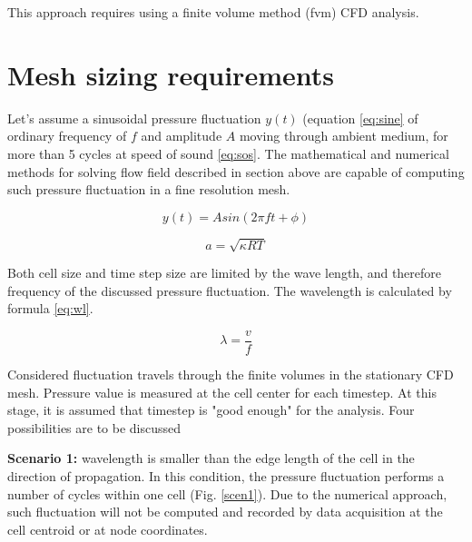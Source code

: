 This approach requires using a finite volume method (fvm) CFD analysis.



\section{Mesh sizing requirements} \label{meshsize}
Let's assume a sinusoidal pressure fluctuation $y(t)$ (equation \ref{eq:sine} of ordinary frequency of $f$ and amplitude $A$ moving through ambient medium, for more than 5 cycles at speed of sound \ref{eq:sos}. The mathematical and numerical methods for solving flow field described in section above are capable of computing such pressure fluctuation in a fine resolution mesh. 

\begin{equation} \label{eq:sine}
y(t) = A sin(2 \pi f t + \phi)
\end{equation}

\begin{equation} \label{eq:sos}
a = \sqrt{\kappa R T}
\end{equation}

Both cell size and time step size are limited by the wave length, and therefore frequency of the discussed pressure fluctuation. The wavelength is calculated by formula \ref{eq:wl}.

\begin{equation} \label{eq:wl}
\lambda = \frac{v}{f}
\end{equation}

Considered fluctuation travels through the finite volumes in the stationary CFD mesh. Pressure value is measured at the cell center for each timestep. At this stage, it is assumed that timestep is "good enough" for the analysis. Four possibilities are to be discussed 

\textbf{Scenario 1:} wavelength is smaller than the edge length of the cell in the direction of propagation. In this condition, the pressure fluctuation performs a number of cycles within one cell (Fig. \ref{scen1}). Due to the numerical approach, such fluctuation will not be computed and recorded by data acquisition at the cell centroid or at node coordinates.

